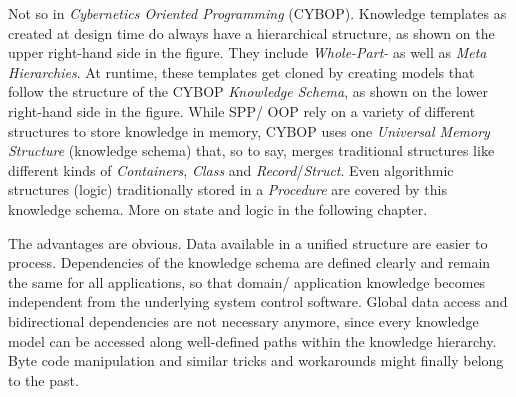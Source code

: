 Not so in \emph{Cybernetics Oriented Programming} (CYBOP). Knowledge templates
as created at design time do always have a hierarchical structure, as shown on
the upper right-hand side in the figure. They include \emph{Whole-Part-} as
well as \emph{Meta Hierarchies}. At runtime, these templates get cloned by
creating models that follow the structure of the CYBOP \emph{Knowledge Schema},
as shown on the lower right-hand side in the figure. While SPP/ OOP rely on a
variety of different structures to store knowledge in memory, CYBOP uses one
\emph{Universal Memory Structure} (knowledge schema) that, so to say, merges
traditional structures like different kinds of \emph{Containers}, \emph{Class}
and \emph{Record}/\emph{Struct}. Even algorithmic structures (logic)
traditionally stored in a \emph{Procedure} are covered by this knowledge
schema. More on state and logic in the following chapter.

The advantages are obvious. Data available in a unified structure are easier to
process. Dependencies of the knowledge schema are defined clearly and remain
the same for all applications, so that domain/ application knowledge becomes
independent from the underlying system control software. Global data access and
bidirectional dependencies are not necessary anymore, since every knowledge
model can be accessed along well-defined paths within the knowledge hierarchy.
Byte code manipulation and similar tricks and workarounds might finally belong
to the past.
